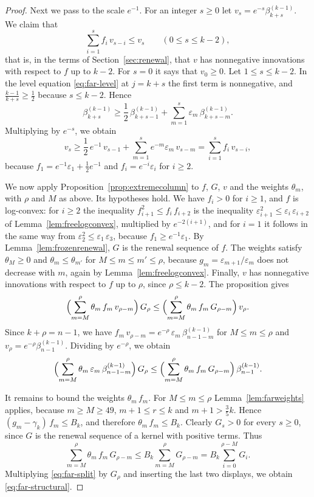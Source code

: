 \documentclass{amsart}
\theoremstyle{definition}
\theoremstyle{remark}
\numberwithin{equation}{section}
\begin{document}
\begin{proof}
Next we pass to the scale $e^{-1}$. For an integer $s\ge 0$ let $v_s=e^{-s}\beta^{(k-1)}_{k+s}$. We claim that
\[
\sum_{i=1}^{s}f_i\,v_{s-i}\le v_s\qquad(0\le s\le k-2),
\]
that is, in the terms of Section~\ref{sec:renewal}, that $v$ has nonnegative innovations with respect to $f$ up to $k-2$. For $s=0$ it says that $v_0\ge 0$. Let $1\le s\le k-2$. In the level equation \eqref{eq:far-level} at $j=k+s$ the first term is nonnegative, and $\frac{k-1}{k+s}\ge\frac12$ because $s\le k-2$. Hence
\[
\beta^{(k-1)}_{k+s}\ge\frac12\,\beta^{(k-1)}_{k+s-1}+\sum_{m=1}^{s}\varepsilon_m\,\beta^{(k-1)}_{k+s-m}.
\]
Multiplying by $e^{-s}$, we obtain
\[
v_s\ge\frac12\,e^{-1}\,v_{s-1}+\sum_{m=1}^{s}e^{-m}\varepsilon_m\,v_{s-m}=\sum_{i=1}^{s}f_i\,v_{s-i},
\]
because $f_1=e^{-1}\varepsilon_1+\frac12e^{-1}$ and $f_i=e^{-i}\varepsilon_i$ for $i\ge 2$.

We now apply Proposition~\ref{prop:extremecolumn} to $f$, $G$, $v$ and the weights $\theta_m$, with $\rho$ and $M$ as above. Its hypotheses hold. We have $f_i>0$ for $i\ge 1$, and $f$ is log-convex: for $i\ge 2$ the inequality $f_{i+1}^2\le f_i\,f_{i+2}$ is the inequality $\varepsilon_{i+1}^2\le\varepsilon_i\,\varepsilon_{i+2}$ of Lemma~\ref{lem:freelogconvex}, multiplied by $e^{-2(i+1)}$, and for $i=1$ it follows in the same way from $\varepsilon_2^2\le\varepsilon_1\,\varepsilon_3$, because $f_1\ge e^{-1}\varepsilon_1$. By Lemma~\ref{lem:frozenrenewal}, $G$ is the renewal sequence of $f$. The weights satisfy $\theta_M\ge 0$ and $\theta_m\le\theta_{m'}$ for $M\le m\le m'\le\rho$, because $g_m=\varepsilon_{m+1}/\varepsilon_m$ does not decrease with $m$, again by Lemma~\ref{lem:freelogconvex}. Finally, $v$ has nonnegative innovations with respect to $f$ up to $\rho$, since $\rho\le k-2$. The proposition gives
\[
\Bigl(\sum_{m=M}^{\rho}\theta_m\,f_m\,v_{\rho-m}\Bigr)\,G_\rho\le\Bigl(\sum_{m=M}^{\rho}\theta_m\,f_m\,G_{\rho-m}\Bigr)\,v_\rho .
\]
Since $k+\rho=n-1$, we have $f_m\,v_{\rho-m}=e^{-\rho}\,\varepsilon_m\,\beta^{(k-1)}_{n-1-m}$ for $M\le m\le\rho$ and $v_\rho=e^{-\rho}\beta^{(k-1)}_{n-1}$. Dividing by $e^{-\rho}$, we obtain
\[
\Bigl(\sum_{m=M}^{\rho}\theta_m\,\varepsilon_m\,\beta^{(k-1)}_{n-1-m}\Bigr)\,G_\rho\le\Bigl(\sum_{m=M}^{\rho}\theta_m\,f_m\,G_{\rho-m}\Bigr)\,\beta^{(k-1)}_{n-1}.
\]

It remains to bound the weights $\theta_m\,f_m$. For $M\le m\le\rho$ Lemma~\ref{lem:farweights} applies, because $m\ge M\ge 49$, $m+1\le r\le k$ and $m+1>\frac35k$. Hence $(g_m-\gamma_k)\,f_m\le B_k$, and therefore $\theta_m\,f_m\le B_k$. Clearly $G_s>0$ for every $s\ge 0$, since $G$ is the renewal sequence of a kernel with positive terms. Thus
\[
\sum_{m=M}^{\rho}\theta_m\,f_m\,G_{\rho-m}\le B_k\sum_{m=M}^{\rho}G_{\rho-m}=B_k\sum_{i=0}^{\rho-M}G_i .
\]
Multiplying \eqref{eq:far-split} by $G_\rho$ and inserting the last two displays, we obtain \eqref{eq:far-structural}.


\end{proof}
\end{document}
